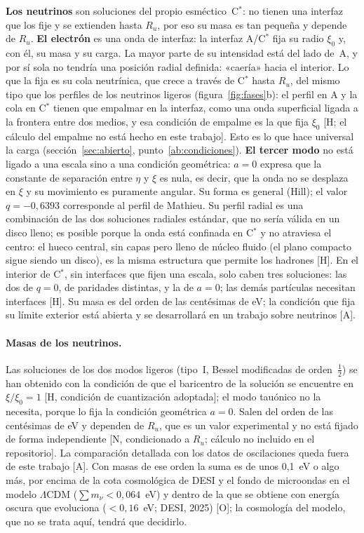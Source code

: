 \documentclass[11pt,a4paper]{article}
\newcommand{\st}[1]{\textup{[#1]}}
\newcommand{\Cst}{C\ensuremath{^{*}}}
\newcommand{\apartado}[1]{\paragraph{#1}}
\begin{document}
\textbf{Los neutrinos} son soluciones del propio esméctico~\Cst: no tienen una interfaz que los fije y se extienden hasta $R_u$, por eso su masa es tan pequeña y depende de $R_u$. \textbf{El electrón} es una onda de interfaz: la interfaz A/\Cst{} fija su radio $\xi_0$ y, con él, su masa y su carga. La mayor parte de su intensidad está del lado de~A, y por sí sola no tendría una posición radial definida: «caería» hacia el interior. Lo que la fija es su cola neutrínica, que crece a través de \Cst{} hasta $R_u$, del mismo tipo que los perfiles de los neutrinos ligeros (figura~\ref{fig:fases}b): el perfil en A y la cola en \Cst{} tienen que empalmar en la interfaz, como una onda superficial ligada a la frontera entre dos medios, y esa condición de empalme es la que fija $\xi_0$ \st{H; el cálculo del empalme no está hecho en este trabajo}. Esto es lo que hace universal la carga (sección~\ref{sec:abierto}, punto~\ref{ab:condiciones}). \textbf{El tercer modo} no está ligado a una escala sino a una condición geométrica: $a=0$ expresa que la constante de separación entre $\eta$ y $\xi$ es nula, es decir, que la onda no se desplaza en $\xi$ y su movimiento es puramente angular. Su forma es general (Hill); el valor $q=-0,6393$ corresponde al perfil de Mathieu. Su perfil radial es una combinación de las dos soluciones radiales estándar, que no sería válida en un disco lleno; es posible porque la onda está confinada en \Cst{} y no atraviesa el centro: el hueco central, sin capas pero lleno de núcleo fluido (el plano compacto sigue siendo un disco), es la misma estructura que permite los hadrones \st{H}. En el interior de \Cst, sin interfaces que fijen una escala, solo caben tres soluciones: las dos de $q=0$, de paridades distintas, y la de $a=0$; las demás partículas necesitan interfaces \st{H}. Su masa es del orden de las centésimas de eV; la condición que fija su límite exterior está abierta y se desarrollará en un trabajo sobre neutrinos \st{A}.

\apartado{Masas de los neutrinos.} Las soluciones de los dos modos ligeros (tipo~I, Bessel modificadas de orden~$\tfrac12$) se han obtenido con la condición de que el baricentro de la solución se encuentre en $\xi/\xi_0=1$ \st{H, condición de cuantización adoptada}; el modo tauónico no la necesita, porque lo fija la condición geométrica $a=0$. Salen del orden de las centésimas de eV y dependen de $R_u$, que es un valor experimental y no está fijado de forma independiente \st{N, condicionado a $R_u$; cálculo no incluido en el repositorio}. La comparación detallada con los datos de oscilaciones queda fuera de este trabajo \st{A}. Con masas de ese orden la suma es de unos 0,1~eV o algo más, por encima de la cota cosmológica de DESI y el fondo de microondas en el modelo $\Lambda$CDM ($\sum m_\nu<0,064$~eV) y dentro de la que se obtiene con energía oscura que evoluciona ($<0,16$~eV; DESI, 2025) \st{O}; la cosmología del modelo, que no se trata aquí, tendrá que decidirlo.
\end{document}
